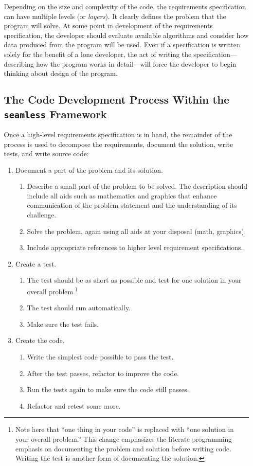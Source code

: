 Depending on the size and complexity of the code, the requirements specification can have
multiple levels (or \textit{layers}). 
It clearly defines the problem that the program will solve. 
At some point in development of the requirements specification,
the developer should evaluate available algorithms and consider how data produced from the 
program will be used.
Even if a specification is written solely for the benefit of a lone developer, the act of 
writing the specification---describing how the program works in 
detail---will force the developer to begin thinking about design of the program.

\subsection{The Code Development Process Within the \texttt{seamless} Framework}\label{tdd-better}
Once a high-level requirements specification is in hand, the remainder of the \seamless process is
used to decompose the requirements, document the solution, write tests, and write source code:
\begin{enumerate}
\item Document a part of the problem and its solution.
  \begin{enumerate}
  \item Describe a small part of the problem to be solved. The description should include    
all aids such as mathematics and graphics that enhance communication of the problem 
statement and the understanding of its challenge. 
  \item Solve the problem, again using all aids at your disposal (\eg math, graphics).
  \item Include appropriate references to higher level requirement specifications.
  \end{enumerate}
\item Create a test. 
\begin{enumerate}
  \item The test should be as short as possible and test for one solution in your overall
  problem.\footnote{Note here that ``one thing in your code'' is replaced with ``one
  solution in your overall problem.'' This change emphasizes the literate programming emphasis
  on documenting the problem and solution before writing code. Writing the test is another
  form of documenting the solution.}
  \item The test should run automatically.
  \item Make sure the test fails. 
\end{enumerate}
\item Create the code.
  \begin{enumerate}
  \item Write the simplest code possible to pass the test. 
  \item After the test passes, refactor to improve the code. 
  \item Run the tests again to make sure the code still passes.
  \item Refactor and retest some more.
  \end{enumerate}
\end{enumerate}

